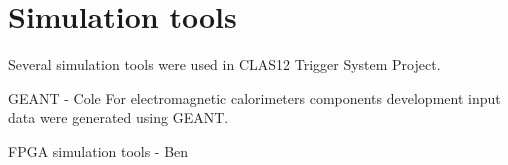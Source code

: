 \section{Simulation tools}

Several simulation tools were used in CLAS12 Trigger System Project.

GEANT - Cole
For electromagnetic calorimeters components development input data were generated using GEANT.

FPGA simulation tools - Ben


